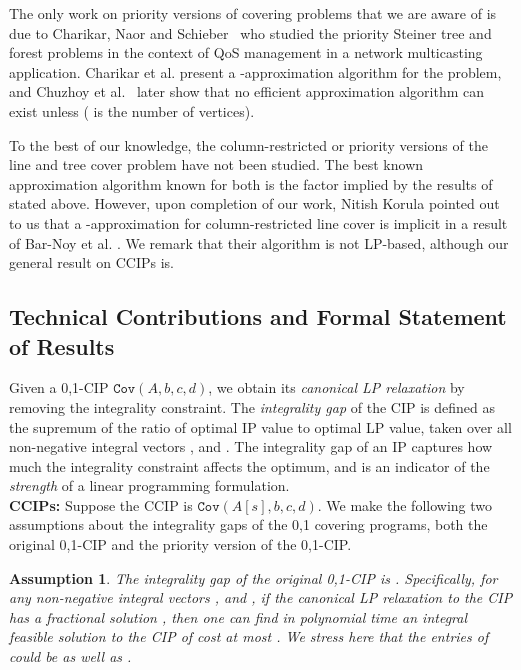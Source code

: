 \documentclass[11pt]{article}
\newtheorem{assumption}{Assumption}
\newcommand{\cov}[1]{\ensuremath{\mathtt{Cov}(#1)}}
\newcommand{\1}{\mathbb{1}}
\begin{document}
The only work on priority versions of covering problems that we are
aware of is due to Charikar, Naor and Schieber~\cite{CNS04} who
studied the priority Steiner tree and forest problems in the context of QoS
management in a network multicasting application.  Charikar et
al. present a -approximation algorithm for the problem, and
Chuzhoy et al.~\cite{CG+08} later show that no efficient  approximation algorithm can exist unless  ( is the number of vertices).

To the best of our knowledge, the column-restricted or priority
versions of the line and tree cover problem have not been studied. The
best known approximation algorithm known for both is the 
factor implied by the results of \cite{KY05} stated above. However,
upon completion of our work, Nitish Korula \cite{Ko09} pointed out to
us that a -approximation for column-restricted line cover is
implicit in a result of Bar-Noy et al. \cite{BarNoy}.  We remark that
their algorithm is not LP-based, although our general result on CCIPs
is.

\subsection{Technical Contributions and Formal Statement of Results}\label{sec:tech}
\noindent
Given a 0,1-CIP \cov{A,b,c,d}, we obtain its {\em canonical LP
  relaxation} by removing the integrality constraint.  The {\em
  integrality gap} of the CIP is defined as the supremum of the ratio
of optimal IP value to optimal LP value, taken over all non-negative 
integral vectors , and . The integrality gap of an IP
captures how much the integrality constraint affects the optimum, and
is an indicator of the {\em strength} of a linear programming
formulation.  \\

\noindent
{\bf CCIPs: }
Suppose the CCIP is \cov{A[s],b,c,d}.
We make the following two assumptions about the integrality gaps 
of the 0,1 covering programs, both the original 0,1-CIP and the 
priority version of the 0,1-CIP.

\begin{assumption}\label{as:1}
  The integrality gap of the original 0,1-CIP is . Specifically, for any non-negative integral vectors
  , and , if the canonical LP
  relaxation to the CIP has a fractional solution , then one can
  find in polynomial time an integral feasible solution to the CIP of
  cost at most . We stress here that the entries
  of  could be  as well as .
\end{assumption}
\end{document}
